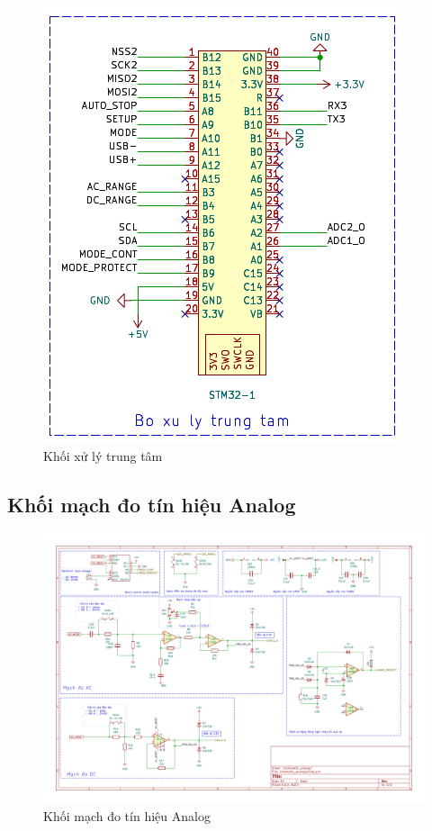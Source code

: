	\begin{figure}[H]
		\centering
		\includegraphics[width=0.7\linewidth]{./picture/main_vxl.pdf}
		\caption{Khối xử lý trung tâm}
		\label{main vxl}
	\end{figure}
	
	\subsection{Khối mạch đo tín hiệu Analog}
	
	\begin{figure}[H]
		\includegraphics[width=\linewidth]{./picture/board_analog.pdf}
		\caption{Khối mạch đo tín hiệu Analog}
		\label{board analog}
	\end{figure}
	
